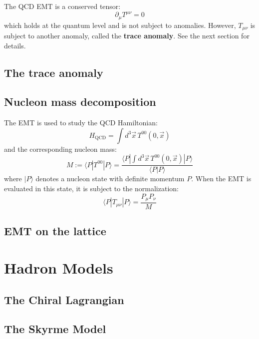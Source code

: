 \documentclass[11pt, oneside]{article}   	%
\theoremstyle{definition}
\begin{document}
The QCD EMT is a conserved tensor:
\begin{equation}
	\partial_\mu T^{\mu\nu} = 0
\end{equation}
which holds at the quantum level and is not subject to anomalies. However, $T_{\mu\nu}$ is subject to another anomaly, called 
the \textbf{trace anomaly}. See the next section for details.

\subsection{The trace anomaly}

\subsection{Nucleon mass decomposition}
The EMT is used to study the QCD Hamiltonian:
\begin{equation}
	H_\mathrm{QCD} = \int d^3\vec x \, T^{00} (0, \vec x)
\end{equation}
and the corresponding nucleon mass:
\begin{equation}
	M := \langle P | T^{00} | P\rangle = \frac{\langle P | \int d^3\vec x\, T^{00}(0, \vec x) | P\rangle}{\langle P | P\rangle}
\end{equation}
where $|P\rangle$ denotes a nucleon state with definite momentum $P$. When the EMT is evaluated in this state, it is subject 
to the normalization:
\begin{equation}
	\langle P | T_{\mu\nu} | P\rangle = \frac{P_\mu P_\nu}{M}
\end{equation}

\subsection{EMT on the lattice}


\newpage
\section{Hadron Models}

\subsection{The Chiral Lagrangian}

\subsection{The Skyrme Model}
\end{document}
